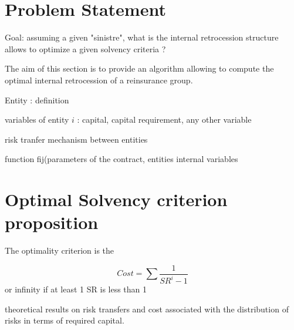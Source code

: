 \section{Problem Statement}

Goal: assuming a given "sinistre", what is the internal retrocession structure allows to optimize a given solvency criteria ?

The aim of this section is to provide an algorithm allowing to compute the optimal internal retrocession of a reinsurance group.


Entity : definition

variables of entity $i$ : capital, capital requirement, any other variable

risk tranfer mechanism between entities

function fij(parameters of the contract, entities internal variables



\section{Optimal Solvency criterion proposition }

The optimality criterion is the 

\begin{equation}
	Cost = \sum \frac{1}{SR^i - 1}
\end{equation}
or infinity if at least 1 SR is less than 1


theoretical results on risk transfers and cost associated with the distribution of risks in terms of required capital.


